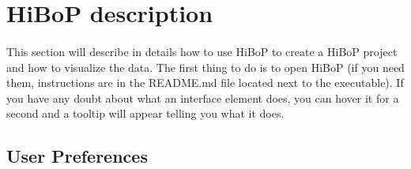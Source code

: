 \documentclass[a4paper]{article}
\begin{document}
\section{HiBoP description}\label{UI}
\paragraph{} This section will describe in details how to use HiBoP to create a HiBoP project and how to visualize the data. The first thing to do is to open HiBoP (if you need them, instructions are in the README.md file located next to the executable). If you have any doubt about what an interface element does, you can hover it for a second and a tooltip will appear telling you what it does.
\subsection{User Preferences}\label{preferences}
\end{document}
